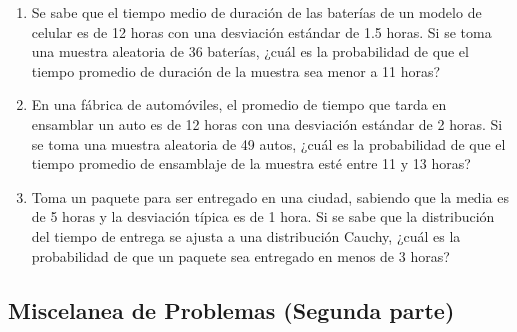\begin{Ejer}
\begin{enumerate}
    \item Se sabe que el tiempo medio de duración de las baterías de un modelo de celular es de 12 horas con una desviación estándar de 1.5 horas. Si se toma una muestra aleatoria de 36 baterías, ¿cuál es la probabilidad de que el tiempo promedio de duración de la muestra sea menor a 11 horas?

    \item En una fábrica de automóviles, el promedio de tiempo que tarda en ensamblar un auto es de 12 horas con una desviación estándar de 2 horas. Si se toma una muestra aleatoria de 49 autos, ¿cuál es la probabilidad de que el tiempo promedio de ensamblaje de la muestra esté entre 11 y 13 horas?

    \item Toma un paquete para ser entregado en una ciudad, sabiendo que la media es de 5 horas y la desviación típica es de 1 hora. Si se sabe que la distribución del tiempo de entrega se ajusta a una distribución Cauchy, ¿cuál es la probabilidad de que un paquete sea entregado en menos de 3 horas?


\end{enumerate}

\end{Ejer}

\subsection{Miscelanea de Problemas (Segunda parte)}

